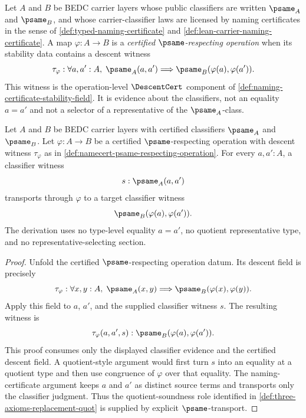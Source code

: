 \begin{definition}
\label{def:namecert-psame-respecting-operation}
Let $A$ and $B$ be BEDC carrier layers whose public classifiers are written $\psame_A$ and $\psame_B$, and whose carrier-classifier laws are licensed by naming certificates in the sense of \autoref{def:typed-naming-certificate} and \autoref{def:lean-carrier-naming-certificate}. A map $\varphi:A\to B$ is a \emph{certified $\psame$-respecting operation} when its stability data contains a descent witness
$$
\tau_\varphi:\forall a,a':A,\; \psame_A(a,a')\Longrightarrow \psame_B(\varphi(a),\varphi(a')).
$$
This witness is the operation-level $\DescentCert$ component of \autoref{def:naming-certificate-stability-field}. It is evidence about the classifiers, not an equality $a=a'$ and not a selector of a representative of the $\psame_A$-class.
\end{definition}

\begin{theorem}
\label{thm:namecert-psame-transport-replaces-quot-sound}
Let $A$ and $B$ be BEDC carrier layers with certified classifiers $\psame_A$ and $\psame_B$. Let $\varphi:A\to B$ be a certified $\psame$-respecting operation with descent witness $\tau_\varphi$ as in \autoref{def:namecert-psame-respecting-operation}. For every $a,a':A$, a classifier witness
$$
s:\psame_A(a,a')
$$
transports through $\varphi$ to a target classifier witness
$$
\psame_B(\varphi(a),\varphi(a')).
$$
The derivation uses no type-level equality $a=a'$, no quotient representative type, and no representative-selecting section.
\end{theorem}
\begin{proof}
Unfold the certified $\psame$-respecting operation datum. Its descent field is precisely
$$
\tau_\varphi:\forall x,y:A,\; \psame_A(x,y)\Longrightarrow \psame_B(\varphi(x),\varphi(y)).
$$
Apply this field to $a$, $a'$, and the supplied classifier witness $s$. The resulting witness is
$$
\tau_\varphi(a,a',s):\psame_B(\varphi(a),\varphi(a')).
$$
This proof consumes only the displayed classifier evidence and the certified descent field. A quotient-style argument would first turn $s$ into an equality at a quotient type and then use congruence of $\varphi$ over that equality. The naming-certificate argument keeps $a$ and $a'$ as distinct source terms and transports only the classifier judgment. Thus the quotient-soundness role identified in \autoref{def:three-axioms-replacement-quot} is supplied by explicit $\psame$-transport.
\end{proof}

